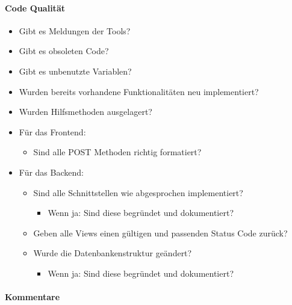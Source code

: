 \documentclass[accentcolor=tud0b,12pt,paper=a4]{tudreport}
\begin{document}
\paragraph{Code Qualität}
\begin{multicols}{2}
	\renewcommand{\labelitemi}{\scriptsize$\square$}	\renewcommand{\labelitemii}{\scriptsize$\square$}
	\renewcommand{\labelitemiii}{\scriptsize$\square$}
	\begin{itemize}

		\item Gibt es Meldungen der Tools?
		\item Gibt es obsoleten Code?
		\item Gibt es unbenutzte Variablen?
		\item Wurden bereits vorhandene Funktionalitäten neu implementiert?
		\item Wurden Hilfsmethoden ausgelagert?
		\item Für das Frontend:
		\begin{itemize}
			\item Sind alle POST Methoden richtig formatiert?
		\end{itemize}
		\item Für das Backend:
		\begin{itemize}
			\item Sind alle Schnittstellen wie abgesprochen implementiert?
			\begin{itemize}
				\item Wenn ja: Sind diese begründet und dokumentiert?
			\end{itemize}
			\item Geben alle Views einen gültigen und passenden Status Code zurück?
			\item Wurde die Datenbankenstruktur geändert?
			\begin{itemize}
				\item Wenn ja: Sind diese begründet und dokumentiert?
			\end{itemize}
		\end{itemize}

	\end{itemize}

\paragraph{Kommentare}


\end{multicols}
\end{document}

